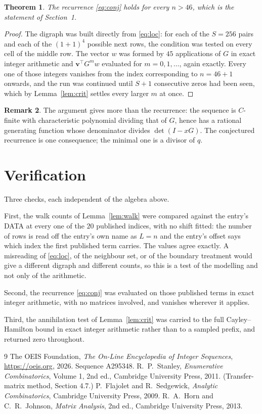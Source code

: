 \documentclass[11pt,a4paper]{article}
\theoremstyle{plain}
\newtheorem{theorem}{Theorem}
\theoremstyle{definition}
\newtheorem{remark}[theorem]{Remark}
\begin{document}
\begin{theorem}
The recurrence \eqref{eq:conj} holds for every $n>46$, which is the statement of
Section~1.
\end{theorem}

\begin{proof}
The digraph was built directly from \eqref{eq:loc}: for each of the $S=256$ pairs and each
of the $(1+1)^{4}$ possible next rows, the condition was tested on every cell of
the middle row. The vector $w$ was formed by $45$ applications of $G$ in exact integer
arithmetic and $\mathbf{v}^{\!\top}G^{m}w$ evaluated for $m=0,1,\dots$, again exactly.
Every one of those integers vanishes from the index corresponding to $n=46+1$ onwards,
and the run was continued until $S+1$ consecutive zeros had been seen, which by
Lemma~\ref{lem:crit} settles every larger $m$ at once.
\end{proof}

\begin{remark}
The argument gives more than the recurrence: the sequence is $C$-finite with characteristic
polynomial dividing that of $G$, hence has a rational generating function whose denominator
divides $\det(I-xG)$. The conjectured recurrence is one consequence; the minimal one is a
divisor of $q$.
\end{remark}

\section{Verification}

Three checks, each independent of the algebra above.

First, the walk counts of Lemma~\ref{lem:walk} were compared against the entry's DATA at
every one of the $20$ published indices, with no shift fitted: the number of rows is
read off the entry's own name as $L=n$ and the entry's offset says which index the first
published term carries. The values agree exactly. A misreading of \eqref{eq:loc}, of the
neighbour set, or of the boundary treatment would give a different digraph and different
counts, so this is a test of the modelling and not only of the arithmetic.

Second, the recurrence \eqref{eq:conj} was evaluated on those published terms in exact
integer arithmetic, with no matrices involved, and vanishes wherever it applies.

Third, the annihilation test of Lemma~\ref{lem:crit} was carried to the full
Cayley--Hamilton bound in exact integer arithmetic rather than to a sampled prefix, and
returned zero throughout.

\begin{thebibliography}{9}
 The OEIS Foundation, \emph{The On-Line Encyclopedia of Integer
Sequences}, \url{https://oeis.org}, 2026. Sequence A295348.
 R.~P.~Stanley, \emph{Enumerative Combinatorics}, Volume 1, 2nd ed.,
Cambridge University Press, 2011. (Transfer-matrix method, Section 4.7.)
 P.~Flajolet and R.~Sedgewick, \emph{Analytic Combinatorics}, Cambridge
University Press, 2009.
 R.~A.~Horn and C.~R.~Johnson, \emph{Matrix Analysis}, 2nd ed., Cambridge
University Press, 2013.
\end{thebibliography}
\end{document}
